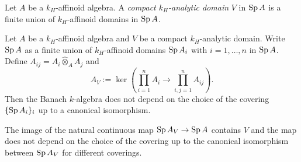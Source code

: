 \begin{definition}
    Let $A$ be a $k_H$-affinoid algebra. A \emph{compact $k_H$-analytic domain} $V$ in $\operatorname{Sp} A$ is a finite union of $k_H$-affinoid domains in $\operatorname{Sp} A$.    
    \end{definition}
    
    
    \begin{lemma}\label{lma-compactanalyticdomainring}
        Let $A$ be a $k_H$-affinoid algebra and $V$ be a compact $k_H$-analytic domain. Write $\operatorname{Sp} A$ as a finite union of $k_H$-affinoid domains $\operatorname{Sp} A_i$ with $i=1,\ldots,n$ in $\operatorname{Sp} A$. Define $A_{ij}=A_i\hat{\otimes}_A A_j$ and 
        \[
            A_V:=\ker  \left( \prod_{i=1}^n A_i \rightarrow \prod_{i,j=1}^n A_{ij}\right).
        \]
        Then the Banach $k$-algebra does not depend on the choice of the covering $\{\operatorname{Sp} A_i\}_i$ up to a canonical isomorphism.
    
        The image of the natural continuous map $\operatorname{Sp} A_V\rightarrow \operatorname{Sp} A$ contains $V$ and the map does not depend on the choice of the covering up to the canonical isomorphism between $\operatorname{Sp} A_V$ for different coverings.
    \end{lemma}
